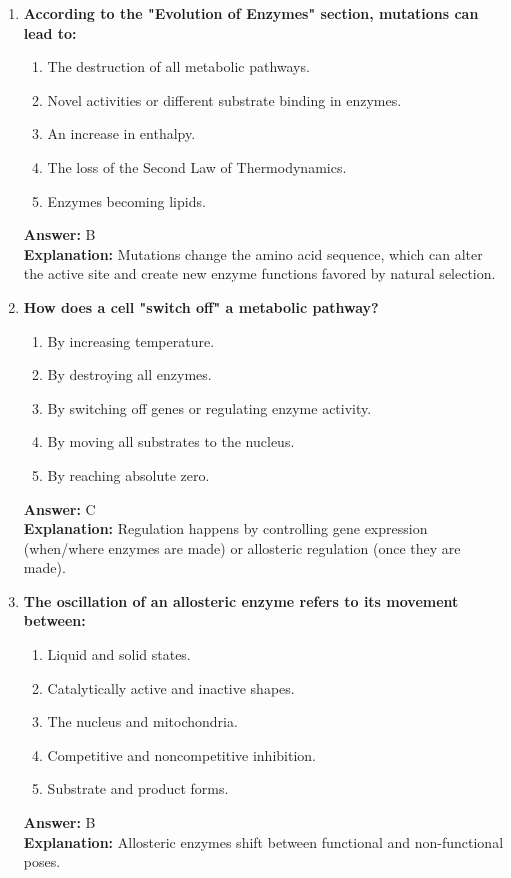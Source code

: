 \documentclass[11pt, a4paper]{article}
\begin{document}
\begin{enumerate}[leftmargin=*, label=\arabic*.]
\item \textbf{According to the "Evolution of Enzymes" section, mutations can lead to:}
\begin{enumerate}[label=\Alph*.]
    \item The destruction of all metabolic pathways.
    \item Novel activities or different substrate binding in enzymes.
    \item An increase in enthalpy.
    \item The loss of the Second Law of Thermodynamics.
    \item Enzymes becoming lipids.
\end{enumerate}
\textbf{Answer:} B \\
\textbf{Explanation:} Mutations change the amino acid sequence, which can alter the active site and create new enzyme functions favored by natural selection.

\item \textbf{How does a cell "switch off" a metabolic pathway?}
\begin{enumerate}[label=\Alph*.]
    \item By increasing temperature.
    \item By destroying all enzymes.
    \item By switching off genes or regulating enzyme activity.
    \item By moving all substrates to the nucleus.
    \item By reaching absolute zero.
\end{enumerate}
\textbf{Answer:} C \\
\textbf{Explanation:} Regulation happens by controlling gene expression (when/where enzymes are made) or allosteric regulation (once they are made).

\item \textbf{The oscillation of an allosteric enzyme refers to its movement between:}
\begin{enumerate}[label=\Alph*.]
    \item Liquid and solid states.
    \item Catalytically active and inactive shapes.
    \item The nucleus and mitochondria.
    \item Competitive and noncompetitive inhibition.
    \item Substrate and product forms.
\end{enumerate}
\textbf{Answer:} B \\
\textbf{Explanation:} Allosteric enzymes shift between functional and non-functional poses.


\end{enumerate}
\end{document}
